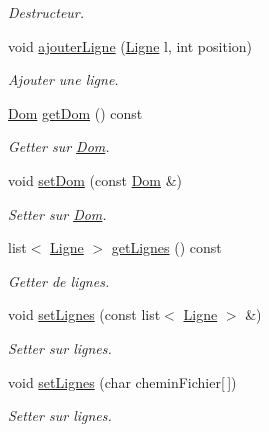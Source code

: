 \begin{DoxyCompactItemize}
\begin{DoxyCompactList}\small\item\em Destructeur. \item\end{DoxyCompactList}\item 
void \hyperlink{classBuffer_aaa71afa6da49b147a7060900288e67d3}{ajouterLigne} (\hyperlink{classLigne}{Ligne} l, int position)
\begin{DoxyCompactList}\small\item\em Ajouter une ligne. \item\end{DoxyCompactList}\item 
\hyperlink{classDom}{Dom} \hyperlink{classBuffer_ae609f810be14bc51b479583957e8d6c1}{getDom} () const 
\begin{DoxyCompactList}\small\item\em Getter sur \hyperlink{classDom}{Dom}. \item\end{DoxyCompactList}\item 
void \hyperlink{classBuffer_a42ebf900f193564fed59440c8ec4286f}{setDom} (const \hyperlink{classDom}{Dom} \&)
\begin{DoxyCompactList}\small\item\em Setter sur \hyperlink{classDom}{Dom}. \item\end{DoxyCompactList}\item 
list$<$ \hyperlink{classLigne}{Ligne} $>$ \hyperlink{classBuffer_af7f5a6f316e5659e462874998c87921d}{getLignes} () const 
\begin{DoxyCompactList}\small\item\em Getter de lignes. \item\end{DoxyCompactList}\item 
void \hyperlink{classBuffer_a8d4cb25f19d9782d663d73ca460e1e37}{setLignes} (const list$<$ \hyperlink{classLigne}{Ligne} $>$ \&)
\begin{DoxyCompactList}\small\item\em Setter sur lignes. \item\end{DoxyCompactList}\item 
void \hyperlink{classBuffer_a122fe744cef772a83c6228195474171d}{setLignes} (char cheminFichier\mbox{[}$\,$\mbox{]})
\begin{DoxyCompactList}\small\item\em Setter sur lignes. \item\end{DoxyCompactList}\item 

\end{DoxyCompactItemize}
